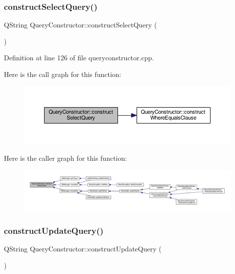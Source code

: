 \subsubsection{\texorpdfstring{construct\+Select\+Query()}{constructSelectQuery()}}
{\footnotesize\ttfamily Q\+String Query\+Constructor\+::construct\+Select\+Query (\begin{DoxyParamCaption}{ }\end{DoxyParamCaption})}



Definition at line 126 of file queryconstructor.\+cpp.

Here is the call graph for this function\+:
\nopagebreak
\begin{figure}[H]
\begin{center}
\leavevmode
\includegraphics[width=350pt]{classQueryConstructor_ae832ca3bc59df18cb8ef08fc1d9fd75f_cgraph}
\end{center}
\end{figure}
Here is the caller graph for this function\+:
\nopagebreak
\begin{figure}[H]
\begin{center}
\leavevmode
\includegraphics[width=350pt]{classQueryConstructor_ae832ca3bc59df18cb8ef08fc1d9fd75f_icgraph}
\end{center}
\end{figure}
\hypertarget{classQueryConstructor_ab17ea91cdd25440b863775526018da22}{}\label{classQueryConstructor_ab17ea91cdd25440b863775526018da22} 
\subsubsection{\texorpdfstring{construct\+Update\+Query()}{constructUpdateQuery()}}
{\footnotesize\ttfamily Q\+String Query\+Constructor\+::construct\+Update\+Query (\begin{DoxyParamCaption}{ }\end{DoxyParamCaption})}



